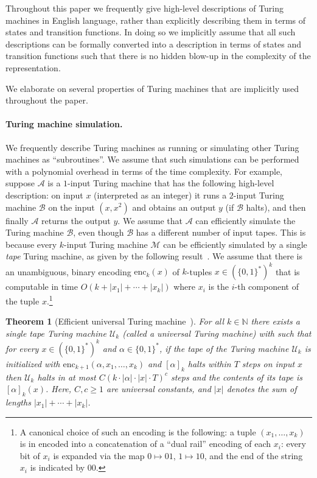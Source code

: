 \documentclass[11pt]{article}
\newtheorem{theorem}{Theorem}[section]
\theoremstyle{definition}
\newcommand{\N}{\ensuremath{\mathbb{N}}}
\renewcommand{\cal}[1]{\mathcal{#1}}
\begin{document}
Throughout this paper we frequently give high-level descriptions of Turing machines in English language, 
rather than explicitly describing them in terms of states and transition functions. In doing so we implicitly assume that all such descriptions can be formally converted into a description in terms of states and transition functions such that there is no hidden blow-up in the complexity of the representation. 




We elaborate on several properties of Turing machines that are implicitly used throughout the paper.


\paragraph{Turing machine simulation.} We frequently describe Turing machines as running or simulating other Turing machines as
``subroutines''. We assume that such simulations can be performed with a polynomial overhead in terms of the time complexity. 
For example, suppose $\cal{A}$ is a $1$-input Turing machine that has the following high-level
description: on input $x$ (interpreted as an integer) it runs a $2$-input Turing machine $\cal{B}$ on the input $(x,x^2)$ and obtains an output $y$ (if $\cal{B}$ halts),
and then finally $\cal{A}$ returns the output $y$. We assume that $\cal{A}$ can efficiently simulate the Turing
machine $\cal{B}$, even though $\cal{B}$ 
has a different number of input tapes. This is because every
$k$-input Turing machine $\cal{M}$ can be efficiently simulated 
by a single \emph{tape} Turing machine, as given by the following result~\cite{hartmanis1965computational}.
We assume that there is an unambiguous, binary encoding
$\mathrm{enc}_k(x)$ of $k$-tuples $x \in (\{0,1\}^*)^k$ that is computable in
time $O(k + |x_1| + \cdots + |x_k|)$ where $x_i$ is the $i$-th component of the
tuple $x$.\footnote{A canonical choice of such an encoding is the following: a
  tuple $(x_1,\ldots,x_k)$ is in encoded into a concatenation of a ``dual rail''
  encoding of each $x_i$: every bit of $x_i$ is expanded via the map $0 \mapsto
  01$, $1 \mapsto 10$, and the end of the string $x_i$ is indicated by $00$.}
 



\begin{theorem}[Efficient universal Turing machine~\cite{hartmanis1965computational}]
  \label{thm:universal-tm}
 For all $k \in \N$ there exists a single tape Turing machine $\cal{U}_k$ (called a \emph{universal Turing machine}) with such
  that for every $x \in (\{0,1\}^*)^k$ and $\alpha \in \{0,1\}^*$, if the tape of 
  the Turing machine $\cal{U}_k$ is initialized with $\mathrm{enc}_{k+1}(\alpha,x_1,\ldots,x_k)$ and 
  $[\alpha]_k$ halts within $T$ steps on input $x$ then $\cal{U}_k$ halts in at most $C(k \cdot |\alpha| \cdot |x| \cdot T)^c$ steps and the contents
    of its tape is $[\alpha]_k(x)$. Here, $C, c \geq 1$ are universal constants, and $|x|$ denotes the sum of lengths $|x_1| + \cdots + |x_k|$. 
    
\end{theorem}
\end{document}
